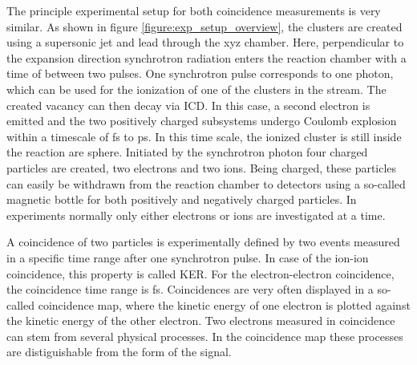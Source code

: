 The principle experimental setup for both coincidence measurements is very similar.
As shown in figure \ref{figure:exp_setup_overview},
the clusters are created using a supersonic jet
and lead through the xyz chamber. Here, perpendicular to the expansion direction
synchrotron radiation enters the reaction chamber with a time of
\unit[]{} between two pulses.
One synchrotron pulse corresponds to one photon, which can be used for the
ionization
of one of the clusters in the stream. The created vacancy can then decay via ICD.
In this case, a second electron is emitted and the two positively charged
subsystems undergo
Coulomb explosion within a timescale of \unit{fs} to \unit[]{ps}.
In this time scale, the ionized cluster is still inside the reaction are sphere.
Initiated by the synchrotron photon four charged particles are created,
two electrons and two ions.
Being charged, these particles can easily be withdrawn from the reaction
chamber to detectors using a so-called magnetic bottle for both positively
and negatively charged particles. In experiments normally only either electrons
or ions are investigated at a time.

A coincidence of two particles is experimentally defined by two events
measured in a specific time range after one synchrotron pulse.
In case of the ion-ion coincidence, this property is called \ac{KER}.
For the
electron-electron coincidence, the coincidence time range is \unit[xyz]{fs}.
Coincidences are very often displayed in a so-called coincidence map,
where the kinetic energy of one electron is plotted against the
kinetic energy of the other electron. 
Two electrons measured in coincidence can stem from several physical
processes. In the coincidence map these processes are distiguishable
from the form of the signal.

